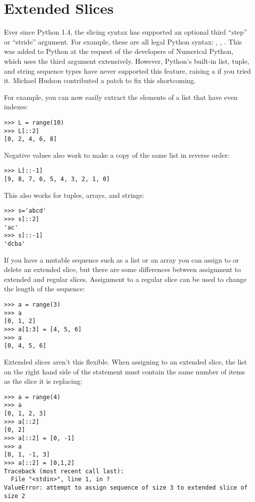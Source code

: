 \documentclass{howto}
\begin{document}
\section{Extended Slices\label{section-slices}}

Ever since Python 1.4, the slicing syntax has supported an optional
third ``step'' or ``stride'' argument.  For example, these are all
legal Python syntax: , ,
.  This was added to Python at the request of
the developers of Numerical Python, which uses the third argument
extensively.  However, Python's built-in list, tuple, and string
sequence types have never supported this feature, raising a
 if you tried it.  Michael Hudson contributed a
patch to fix this shortcoming.

For example, you can now easily extract the elements of a list that
have even indexes:

\begin{verbatim}
>>> L = range(10)
>>> L[::2]
[0, 2, 4, 6, 8]
\end{verbatim}

Negative values also work to make a copy of the same list in reverse
order:

\begin{verbatim}
>>> L[::-1]
[9, 8, 7, 6, 5, 4, 3, 2, 1, 0]
\end{verbatim}

This also works for tuples, arrays, and strings:

\begin{verbatim}
>>> s='abcd'
>>> s[::2]
'ac'
>>> s[::-1]
'dcba'
\end{verbatim}

If you have a mutable sequence such as a list or an array you can
assign to or delete an extended slice, but there are some differences
between assignment to extended and regular slices.  Assignment to a
regular slice can be used to change the length of the sequence:

\begin{verbatim}
>>> a = range(3)
>>> a
[0, 1, 2]
>>> a[1:3] = [4, 5, 6]
>>> a
[0, 4, 5, 6]
\end{verbatim}

Extended slices aren't this flexible.  When assigning to an extended
slice, the list on the right hand side of the statement must contain
the same number of items as the slice it is replacing:

\begin{verbatim}
>>> a = range(4)
>>> a
[0, 1, 2, 3]
>>> a[::2]
[0, 2]
>>> a[::2] = [0, -1]
>>> a
[0, 1, -1, 3]
>>> a[::2] = [0,1,2]
Traceback (most recent call last):
  File "<stdin>", line 1, in ?
ValueError: attempt to assign sequence of size 3 to extended slice of size 2
\end{verbatim}
\end{document}
